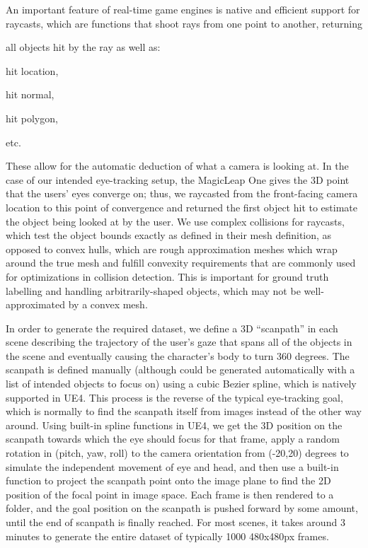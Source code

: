 An important feature of real-time game engines is native and efficient support
for raycasts, which are functions that shoot rays from one point to another,
returning
\begin{inlist}
\item all objects hit by the ray as well as:
\item hit location,
\item hit normal,
\item hit polygon,
\item etc.
\end{inlist}
These allow for the automatic deduction of what a camera is looking at. In the
case of our intended eye-tracking setup, the MagicLeap One gives the 3D point that the
users' eyes converge on; thus, we raycasted from the front-facing camera
location to this point of convergence and returned the first object hit to
estimate the object being looked at by the user. We use complex collisions for raycasts, which test the object bounds exactly as defined in their mesh definition, as opposed to convex hulls, which are rough approximation meshes which wrap around the true mesh and fulfill convexity requirements that are commonly used for optimizations in collision detection. This is important for ground truth labelling and handling arbitrarily-shaped objects, which may not be well-approximated by a convex mesh.

In order to generate the required dataset, we define a 3D ``scanpath'' in each scene
describing the trajectory of the user's gaze that spans all of the objects in
the scene and eventually causing the character's body to turn 360 degrees. The scanpath is defined manually (although could be generated automatically with a list of intended objects to focus on) using a cubic Bezier spline, which is natively supported in UE4. This process is the reverse of the typical eye-tracking goal, which is normally to find the scanpath itself from images instead of the other way around. Using built-in spline functions in UE4, we get the 3D position on the scanpath towards which the eye should focus for that frame, apply a random rotation in (pitch, yaw, roll) to the camera orientation from (-20,20) degrees to simulate the independent movement of eye and head, and then use a built-in function to project the scanpath point onto the image plane to find the 2D position of the focal point in image space. Each frame is then rendered to a folder, and the goal position on the scanpath is pushed forward by some amount, until the end of scanpath is finally reached. For most scenes, it takes around 3 minutes to generate the entire dataset of typically 1000 480x480px frames.

